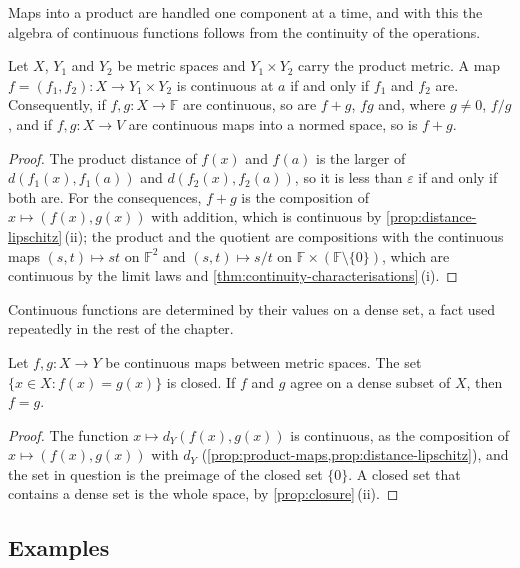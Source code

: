 Maps into a product are handled one component at a time, and with this the algebra of continuous functions follows from the continuity of the operations.

\begin{proposition}
\label{prop:product-maps}
Let $X$, $Y_1$ and $Y_2$ be metric spaces and $Y_1\times Y_2$ carry the product metric. A map $f=(f_1,f_2)\colon X\to Y_1\times Y_2$ is continuous at $a$ if and only if $f_1$ and $f_2$ are. Consequently, if $f,g\colon X\to\mathbb F$ are continuous, so are $f+g$, $fg$ and, where $g\ne0$, $f/g$, and if $f,g\colon X\to V$ are continuous maps into a normed space, so is $f+g$.
\end{proposition}

\begin{proof}
The product distance of $f(x)$ and $f(a)$ is the larger of $d(f_1(x),f_1(a))$ and $d(f_2(x),f_2(a))$, so it is less than $\varepsilon$ if and only if both are. For the consequences, $f+g$ is the composition of $x\mapsto(f(x),g(x))$ with addition, which is continuous by \cref{prop:distance-lipschitz}\,(ii); the product and the quotient are compositions with the continuous maps $(s,t)\mapsto st$ on $\mathbb F^2$ and $(s,t)\mapsto s/t$ on $\mathbb F\times(\mathbb F\setminus\{0\})$, which are continuous by the limit laws and \cref{thm:continuity-characterisations}\,(i).
\end{proof}

Continuous functions are determined by their values on a dense set, a fact used repeatedly in the rest of the chapter.

\begin{proposition}
\label{prop:dense-agree}
Let $f,g\colon X\to Y$ be continuous maps between metric spaces. The set $\{x\in X: f(x)=g(x)\}$ is closed. If $f$ and $g$ agree on a dense subset of $X$, then $f=g$.
\end{proposition}

\begin{proof}
The function $x\mapsto d_Y(f(x),g(x))$ is continuous, as the composition of $x\mapsto(f(x),g(x))$ with $d_Y$ (\cref{prop:product-maps,prop:distance-lipschitz}), and the set in question is the preimage of the closed set $\{0\}$. A closed set that contains a dense set is the whole space, by \cref{prop:closure}\,(ii).
\end{proof}

\subsection{Examples}

